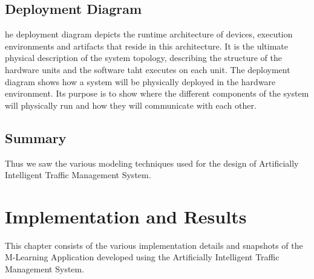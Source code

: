 \documentclass[openany,12pt]{report}
\begin{document}
\newpage
\section{Deployment Diagram}
\hspace*{0.5in}he deployment diagram depicts the runtime architecture of devices, execution environments and artifacts that reside in this architecture. It is the ultimate physical description of the system topology, describing the structure of the hardware units and the software taht executes on each unit. The deployment diagram shows how a system will be physically deployed in the hardware environment. Its purpose is to show where the different components of the system will physically run and how they will communicate with each other.

\section{Summary}
\hspace*{0.5in}Thus we saw the various modeling techniques used for the design of Artificially Intelligent Traffic Management System.

\chapter{Implementation and Results}
\hspace*{0.5in}This chapter consists of the various implementation details and snapshots of the M-Learning Application developed using the Artificially Intelligent Traffic Management System.
\end{document}
